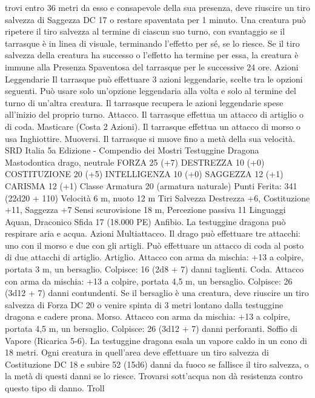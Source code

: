 \begin{multicols}{2}
trovi entro 36 metri da esso e consapevole della sua presenza,
deve riuscire un tiro salvezza di Saggezza DC 17 o restare
spaventata per 1 minuto. Una creatura può ripetere il tiro
salvezza al termine di ciascun suo turno, con svantaggio se il
tarrasque è in linea di visuale, terminando l’effetto per sé, se lo
riesce. Se il tiro salvezza della creatura ha successo o l’effetto ha
termine per essa, la creatura è immune alla Presenza Spaventosa
del tarrasque per le successive 24 ore.
Azioni Leggendarie
Il tarrasque può effettuare 3 azioni leggendarie, scelte tra le
opzioni seguenti. Può usare solo un’opzione leggendaria alla
volta e solo al termine del turno di un’altra creatura. Il tarrasque
recupera le azioni leggendarie spese all’inizio del proprio turno.
Attacco. Il tarrasque effettua un attacco di artiglio o di coda.
Masticare (Costa 2 Azioni). Il tarrasque effettua un attacco di
morso o usa Inghiottire.
Muoversi. Il tarrasque si muove fino a metà della sua velocità.
SRD Italia 5a Edizione - Compendio dei Mostri
Testuggine Dragona
Mastodontica drago, neutrale
FORZA 25 (+7)
DESTREZZA 10 (+0)
COSTITUZIONE 20 (+5)
INTELLIGENZA 10 (+0)
SAGGEZZA 12 (+1)
CARISMA 12 (+1)
Classe Armatura 20 (armatura naturale)
\hspace*{0pt}\hfill{Punti Ferita}: 341 (22d20 + 110)
Velocità 6 m, nuoto 12 m
Tiri Salvezza Destrezza +6, Costituzione +11, Saggezza +7
Sensi scurovisione 18 m, Percezione passiva 11
Linguaggi Aquan, Draconico
Sfida 17 (18.000 PE)
Anfibio. La testuggine dragona può respirare aria e acqua.
Azioni
Multiattacco. Il drago può effettuare tre attacchi: uno con il
morso e due con gli artigli. Può effettuare un attacco di coda al
posto di due attacchi di artiglio.
Artiglio. Attacco con arma da mischia: +13 a colpire, portata 3
m, un bersaglio.
Colpisce: 16 (2d8 + 7) danni taglienti.
Coda. Attacco con arma da mischia: +13 a colpire, portata 4,5
m, un bersaglio.
Colpisce: 26 (3d12 + 7) danni contundenti. Se il bersaglio è una
creatura, deve riuscire un tiro salvezza di Forza DC 20 o venire
spinta di 3 metri lontano dalla testuggine dragona e cadere prona.
Morso. Attacco con arma da mischia: +13 a colpire, portata 4,5
m, un bersaglio.
Colpisce: 26 (3d12 + 7) danni perforanti.
Soffio di Vapore (Ricarica 5-6). La testuggine dragona esala un
vapore caldo in un cono di 18 metri. Ogni creatura in quell’area
deve effettuare un tiro salvezza di Costituzione DC 18 e subire
52 (15d6) danni da fuoco se fallisce il tiro salvezza, o la metà di
questi danni se lo riesce. Trovarsi sott’acqua non dà resistenza
contro questo tipo di danno.
Troll

\end{multicols}
